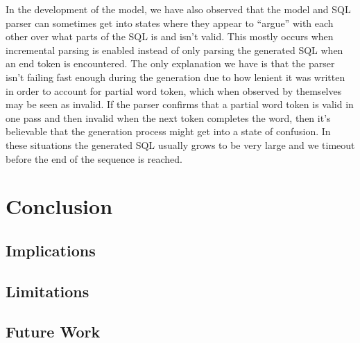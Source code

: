 \documentclass[11pt]{article}
\begin{document}
In the development of the model, we have also observed that the model and SQL parser can sometimes get into states where they appear to ``argue'' with each other over what parts of the SQL is and isn't valid. This mostly occurs when incremental parsing is enabled instead of only parsing the generated SQL when an end token is encountered. The only explanation we have is that the parser isn't failing fast enough during the generation due to how lenient it was written in order to account for partial word token, which when observed by themselves may be seen as invalid. If the parser confirms that a partial word token is valid in one pass and then invalid when the next token completes the word, then it's believable that the generation process might get into a state of confusion. In these situations the generated SQL usually grows to be very large and we timeout before the end of the sequence is reached.







\section{Conclusion}


\subsection{Implications}


\subsection{Limitations}



\subsection{Future Work}
\end{document}
